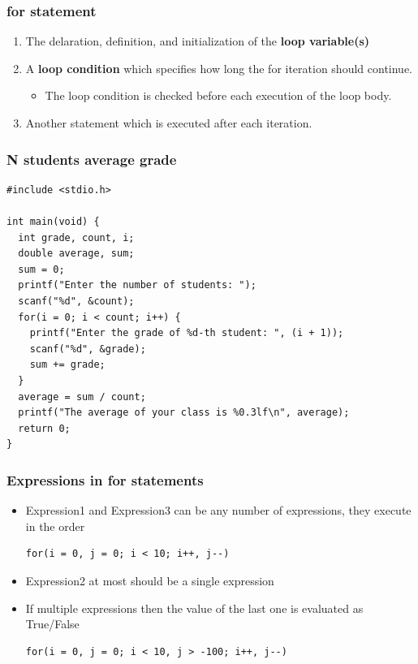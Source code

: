 \documentclass{../c-lecture}
\begin{document}
\begin{frame}
  \frametitle{for statement}
  \begin{enumerate}
    \item The delaration, definition, and initialization of the \textbf{loop variable(s)}
    \item A \textbf{loop condition} which specifies how long the for iteration should continue.
    \begin{itemize}
      \item The loop condition is checked before each execution of the loop body.
    \end{itemize}
    \item Another statement which is executed after each iteration.
  \end{enumerate}
\end{frame}

\begin{frame}[fragile]
  \frametitle{N students average grade}
  \scriptsize
  \begin{verbatim}
#include <stdio.h>

int main(void) {
  int grade, count, i;
  double average, sum;
  sum = 0;
  printf("Enter the number of students: ");
  scanf("%d", &count);
  for(i = 0; i < count; i++) {
    printf("Enter the grade of %d-th student: ", (i + 1));
    scanf("%d", &grade);
    sum += grade;
  }
  average = sum / count;
  printf("The average of your class is %0.3lf\n", average);
  return 0;
}
  \end{verbatim}
\end{frame}

\begin{frame}[fragile]
  \frametitle{Expressions in for statements}
  \begin{itemize}
    \item
      Expression1 and Expression3 can be any number of expressions, they execute
      in the order
    \begin{verbatim}
for(i = 0, j = 0; i < 10; i++, j--)
    \end{verbatim}
    \item Expression2 at most should be a single expression
    \item
      If multiple expressions then the value of the last one is evaluated as
      True/False
    \begin{verbatim}
for(i = 0, j = 0; i < 10, j > -100; i++, j--)
    \end{verbatim}
  \end{itemize}
\end{frame}
\end{document}
